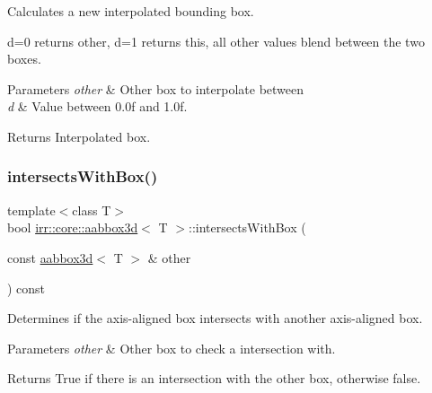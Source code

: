 Calculates a new interpolated bounding box. 

d=0 returns other, d=1 returns this, all other values blend between the two boxes. 
\begin{DoxyParams}{Parameters}
{\em other} & Other box to interpolate between \\
\hline
{\em d} & Value between 0.\+0f and 1.\+0f. \\
\hline
\end{DoxyParams}
\begin{DoxyReturn}{Returns}
Interpolated box. 
\end{DoxyReturn}
\mbox{\label{classirr_1_1core_1_1aabbox3d_a7210d8759855896ba4919a800ad69bbc}} 
\subsubsection{\texorpdfstring{intersects\+With\+Box()}{intersectsWithBox()}\hspace{0.1cm}{\footnotesize\ttfamily [1/2]}}
{\footnotesize\ttfamily template$<$class T$>$ \\
bool \hyperlink{classirr_1_1core_1_1aabbox3d}{irr\+::core\+::aabbox3d}$<$ T $>$\+::intersects\+With\+Box (\begin{DoxyParamCaption}\item[{const \hyperlink{classirr_1_1core_1_1aabbox3d}{aabbox3d}$<$ T $>$ \&}]{other }\end{DoxyParamCaption}) const\hspace{0.3cm}{\ttfamily [inline]}}



Determines if the axis-\/aligned box intersects with another axis-\/aligned box. 


\begin{DoxyParams}{Parameters}
{\em other} & Other box to check a intersection with. \\
\hline
\end{DoxyParams}
\begin{DoxyReturn}{Returns}
True if there is an intersection with the other box, otherwise false. 
\end{DoxyReturn}
\mbox{\label{classirr_1_1core_1_1aabbox3d_a7210d8759855896ba4919a800ad69bbc}} 
